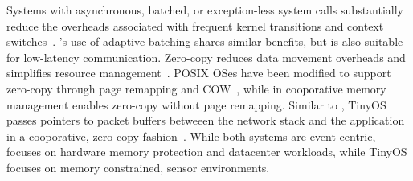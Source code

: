 Systems with asynchronous, batched, or exception-less system calls
substantially reduce the overheads associated with frequent kernel
transitions and context switches~\cite{DBLP:conf/osdi/HanMCR12,jeong2014mtcp,DBLP:journals/cacm/Rizzo12,DBLP:conf/osdi/SoaresS10}. \ix's use of adaptive batching shares similar benefits, but is also
suitable for low-latency communication.
Zero-copy reduces data movement overheads and simplifies resource
management~\cite{DBLP:journals/tocs/PaiDZ00}. POSIX OSes 
have been modified to support zero-copy through page remapping and COW~\cite{DBLP:conf/usenix/Chu96},
while in \ix cooporative memory management enables zero-copy without
page remapping. Similar to \ix, TinyOS passes pointers to packet buffers betweeen
the network stack and the application in a cooporative, zero-copy fashion~\cite{DBLP:conf/nsdi/LevisMGPSWBC04}.
While both systems are event-centric, \ix focuses on hardware memory protection and
datacenter workloads, while TinyOS focuses on memory constrained, sensor environments.


